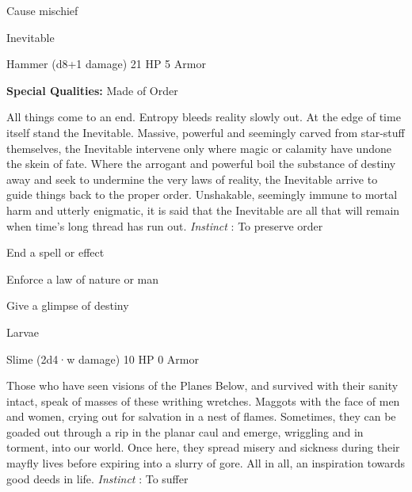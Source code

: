  
\item Cause mischief


\stopitemize
 
\startMonsterName
Inevitable	 
\stopMonsterName
 

Hammer (d8+1 damage)	21 HP	5 Armor

 


 
\startMonsterQualities
{\bf Special Qualities:}  Made of Order
\stopMonsterQualities
 
\startMonsterDescription
All things come to an end. Entropy bleeds reality slowly out. At the edge of time itself stand the Inevitable. Massive, powerful and seemingly carved from star-stuff themselves, the Inevitable intervene only where magic or calamity have undone the skein of fate. Where the arrogant and powerful boil the substance of destiny away and seek to undermine the very laws of reality, the Inevitable arrive to guide things back to the proper order. Unshakable, seemingly immune to mortal harm and utterly enigmatic, it is said that the Inevitable are all that will remain when time’s long thread has run out. {\em Instinct} : To preserve order
\stopMonsterDescription
 
\startitemize[1,packed]

\item End a spell or effect

 
\item Enforce a law of nature or man

 
\item Give a glimpse of destiny


\stopitemize
 
\startMonsterName
Larvae	 
\stopMonsterName
 

Slime (2d4·w damage)	10 HP	0 Armor

 


 
\startMonsterDescription
Those who have seen visions of the Planes Below, and survived with their sanity intact, speak of masses of these writhing wretches. Maggots with the face of men and women, crying out for salvation in a nest of flames. Sometimes, they can be goaded out through a rip in the planar caul and emerge, wriggling and in torment, into our world. Once here, they spread misery and sickness during their mayfly lives before expiring into a slurry of gore. All in all, an inspiration towards good deeds in life. {\em Instinct} : To suffer
\stopMonsterDescription
 
